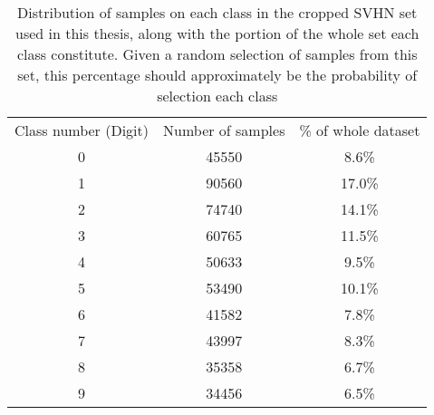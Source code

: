 \begin{table}[ht]
    \centering
    \begin{tabular}{ccc}
    Class number (Digit) & Number of samples & \% of whole dataset\\
    0                    & 45550             & 8.6\%               \\
    1                    & 90560             & 17.0\%              \\
    2                    & 74740             & 14.1\%              \\
    3                    & 60765             & 11.5\%              \\
    4                    & 50633             & 9.5\%               \\
    5                    & 53490             & 10.1\%              \\
    6                    & 41582             & 7.8\%               \\
    7                    & 43997             & 8.3\%               \\
    8                    & 35358             & 6.7\%               \\
    9                    & 34456             & 6.5\%              
    \end{tabular}
    \caption[Class distribution for SVHN image set]{Distribution of samples on each class in the cropped SVHN set used in this thesis, along with the portion of the whole set each class constitute. Given a random selection of samples from this set, this percentage should approximately be the probability of selection each class}
    \label{tab:SVHN}
\end{table} 